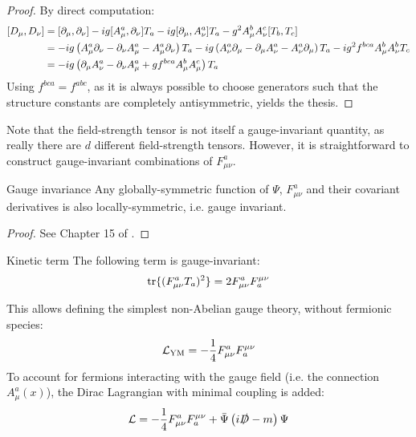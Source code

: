 \begin{proofbox}
  \begin{proof}
    By direct computation:
    \begin{equation*}
      \begin{split}
        [D_\mu , D_\nu]
        & = [\partial_\mu , \partial_\nu] - i g [A_\mu^a , \partial_\nu] T_a - i g [\partial_\mu , A_\nu^a] T_a - g^2 A_\mu^b A_\nu^c [T_b , T_c] \\
        & = - i g \left( A_\mu^a \partial_\nu - \partial_\nu A_\mu^a - A_\mu^a \partial_\nu \right) T_a - i g \left( A_\nu^a \partial_\mu - \partial_\mu A_\nu^a - A_\nu^a \partial_\mu \right) T_a - i g^2 f^{bca} A_\mu^b A_\nu^b T_c \\
        & = - i g \left( \partial_\mu A_\nu^a - \partial_\nu A_\mu^a + g f^{bca} A_\mu^b A_\mu^c \right) T_a
      \end{split}
    \end{equation*}
    Using $ f^{bca} = f^{abc} $, as it is always possible to choose generators such that the structure constants are completely antisymmetric, yields the thesis.
  \end{proof}
\end{proofbox}

Note that the field-strength tensor is not itself a gauge-invariant quantity, as really there are $ d $ different field-strength tensors. However, it is straightforward to construct gauge-invariant combinations of $ F_{\mu \nu}^a $.

\begin{theorem}{Gauge invariance}{}
  Any globally-symmetric function of $ \Psi $, $ F_{\mu \nu}^a $ and their covariant derivatives is also locally-symmetric, i.e. gauge invariant.
\end{theorem}

\begin{proofbox}
  \begin{proof}
    See Chapter 15 of \cite{Peskin-1995}.
  \end{proof}
\end{proofbox}

\begin{lemma}{Kinetic term}{}
  The following term is gauge-invariant:
  \begin{equation}
    \operatorname{tr} \{(F_{\mu \nu}^a T_a)^2\} = 2 F_{\mu \nu}^a F^{\mu \nu}_a
  \end{equation}
\end{lemma}

This allows defining the simplest non-Abelian gauge theory,  without fermionic species:
\begin{equation}
  \mathcal{L}_\text{YM} = - \frac{1}{4} F_{\mu \nu}^a F^{\mu \nu}_a
\end{equation}
To account for fermions interacting with the gauge field (i.e. the connection $ A_\mu^a(x) $), the Dirac Lagrangian with minimal coupling is added:
\begin{equation}
  \mathcal{L} = - \frac{1}{4} F_{\mu \nu}^a F^{\mu \nu}_a + \bar{\Psi} \left( i \slashed{D} - m \right) \Psi
\end{equation}

